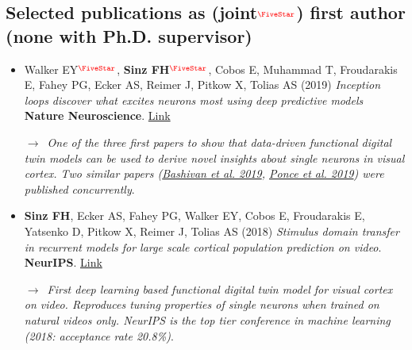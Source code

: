 \documentclass[COG,11pt]{ercgrant}
\begin{document}
\subsection{Selected publications as (joint$^{\color{red}\fstar}$) first author (none with Ph.D. supervisor)}
\begin{itemize}[topsep=0pt,itemsep=0.62ex,partopsep=0ex,parsep=0.5ex]
    \item Walker EY$^{\color{red}\fstar}$, \textbf{Sinz FH}$^{\color{red}\fstar}$, Cobos E, Muhammad T,  Froudarakis E, Fahey PG, Ecker AS, Reimer J, Pitkow X, Tolias AS (2019) \textit{Inception loops discover what excites neurons most using deep predictive models} \textbf{Nature Neuroscience}. \href{https://www.nature.com/articles/s41593-019-0517-x}{Link}

    $\rightarrow$~\textit{One of the three first papers to show that data-driven functional digital twin models can be used to derive novel insights about single neurons in visual cortex. Two similar papers (\href{https://www.science.org/doi/10.1126/science.aav9436}{Bashivan et al. 2019}, \href{https://www.sciencedirect.com/science/article/pii/S0092867419303915}{Ponce et al. 2019}) were published concurrently}.
 
    \item \textbf{Sinz FH}, Ecker AS, Fahey PG, Walker EY, Cobos E, Froudarakis E, Yatsenko D, Pitkow X, Reimer J, Tolias AS (2018) \textit{Stimulus domain transfer in recurrent models for large scale cortical population prediction on video}. \textbf{NeurIPS}. \href{https://proceedings.neurips.cc/paper/2018/file/9d684c589d67031a627ad33d59db65e5-Paper.pdf}{Link}

    $\rightarrow$~\textit{First deep learning based functional digital twin model for visual cortex on video. Reproduces tuning properties of single neurons when trained on natural videos only. NeurIPS is the top tier conference in machine learning (2018: acceptance rate 20.8\%)}.
\end{itemize}
\end{document}
